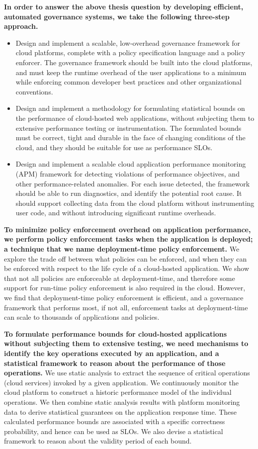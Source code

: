 \textbf{In order to answer the above thesis question by developing efficient, automated governance systems,
we take the following three-step approach.}
\begin{itemize}
\item Design and implement a scalable, low-overhead governance framework for cloud platforms,
complete with a policy specification language and a policy enforcer. The governance framework should be
built into the cloud platforms, and must
keep the runtime overhead of the user applications to a minimum while enforcing
common developer best practices and other organizational conventions.
\item Design and implement a methodology for formulating statistical bounds on the
performance of cloud-hosted web applications, without
 subjecting them to extensive performance testing or instrumentation. The formulated
bounds must be correct, tight and durable in the face of changing
 conditions of the cloud, and they should be suitable for use as performance SLOs.
 \item Design and implement a scalable cloud application performance monitoring (APM) framework for detecting
violations of performance objectives, and other performance-related anomalies. For each
issue detected, the framework should be able to run diagnostics, and identify the potential
root cause. It should support collecting data from the cloud platform
 without instrumenting user code, and without introducing significant runtime overheads.
\end{itemize}

\textbf{To minimize policy enforcement overhead on application performance,
we perform policy enforcement tasks when the application is deployed; a technique that we
name deployment-time policy enforcement.} 
We explore the
trade off between what policies can be enforced, and when they can be enforced with respect
to the life cycle of a cloud-hosted application. 
We show that not all policies
are enforceable at deployment-time, and therefore some support for run-time policy enforcement
is also required in the cloud. However, we find that
deployment-time policy enforcement is efficient, and a governance framework that
performs most, if not all, enforcement tasks at deployment-time can scale
to thousands of applications and policies.

\textbf{To formulate performance bounds for cloud-hosted applications without subjecting them to extensive testing,
we need mechanisms to identify the key operations executed by an application, and a
statistical framework to reason about the performance of those operations.} We use static
analysis to extract the sequence of critical operations (cloud services) invoked by a given application.
We continuously monitor the cloud platform to construct a historic performance model of the individual operations.
We then combine static analysis results with platform monitoring data to
derive statistical guarantees on the application response time. These calculated performance
bounds are associated with a specific correctness probability, and hence can be used
as SLOs. We also devise a statistical framework to reason about the validity period of each bound.

